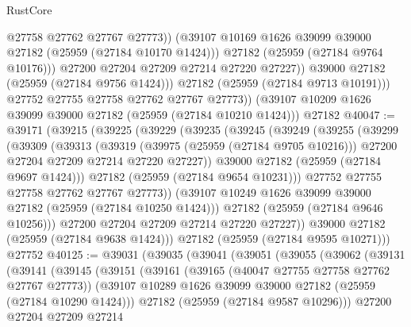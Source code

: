 \begin{lexlean}{RustCore}
\begin{coremodule}
                      @27758
                      @27762
                      @27767
                      @27773))
                  (@39107 @10169 @1626 @39099 @39000 @27182 (@25959 (@27184 @10170 @1424)))
                  @27182
                  (@25959 (@27184 @9764 @10176)))
                @27200
                @27204
                @27209
                @27214
                @27220
                @27227))
            @39000
            @27182
            (@25959 (@27184 @9756 @1424)))
          @27182
          (@25959 (@27184 @9713 @10191)))
        @27752
        @27755
        @27758
        @27762
        @27767
        @27773))
    (@39107 @10209 @1626 @39099 @39000 @27182 (@25959 (@27184 @10210 @1424)))
    @27182
@40047 := @39171
    (@39215
      (@39225
        (@39229
          (@39235
            (@39245
              (@39249
                (@39255
                  (@39299
                    (@39309
                      (@39313
                        (@39319
                          (@39975 (@25959 (@27184 @9705 @10216)))
                          @27200
                          @27204
                          @27209
                          @27214
                          @27220
                          @27227))
                      @39000
                      @27182
                      (@25959 (@27184 @9697 @1424)))
                    @27182
                    (@25959 (@27184 @9654 @10231)))
                  @27752
                  @27755
                  @27758
                  @27762
                  @27767
                  @27773))
              (@39107 @10249 @1626 @39099 @39000 @27182 (@25959 (@27184 @10250 @1424)))
              @27182
              (@25959 (@27184 @9646 @10256)))
            @27200
            @27204
            @27209
            @27214
            @27220
            @27227))
        @39000
        @27182
        (@25959 (@27184 @9638 @1424)))
      @27182
      (@25959 (@27184 @9595 @10271)))
    @27752
@40125 := @39031
    (@39035
      (@39041
        (@39051
          (@39055
            (@39062
              (@39131
                (@39141
                  (@39145
                    (@39151
                      (@39161
                        (@39165 (@40047 @27755 @27758 @27762 @27767 @27773))
                        (@39107 @10289 @1626 @39099 @39000 @27182 (@25959 (@27184 @10290 @1424)))
                        @27182
                        (@25959 (@27184 @9587 @10296)))
                      @27200
                      @27204
                      @27209
                      @27214

\end{coremodule}
\end{lexlean}
